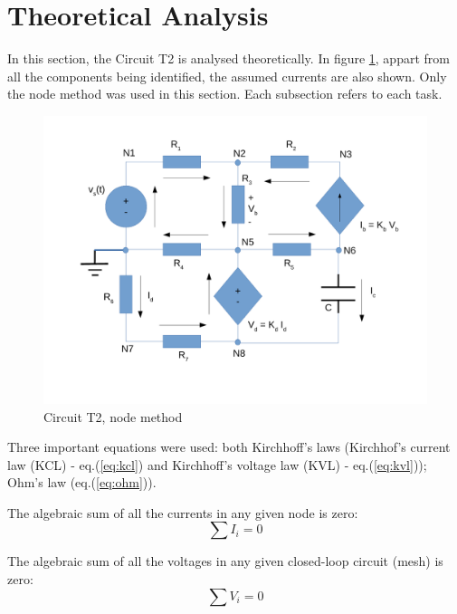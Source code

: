 
\section{Theoretical Analysis}
\label{sec:analysis}



In this section, the Circuit T2 is analysed theoretically. In figure \ref{fig:Dsnh_oct_t2},
appart from all the components being identified, the assumed currents are also shown.
Only the node method was used in this section. Each subsection refers to each task.

\begin{figure}[ht]
	\centering
	\includegraphics[width=0.75\linewidth]{dsnh_oct_t2.pdf}
	\caption{Circuit T2, node method}
\label{fig:Dsnh_oct_t2}
\end{figure}

Three important equations were used: both Kirchhoff's laws (Kirchhof's current law (KCL)
- eq.(\ref{eq:kcl}) and Kirchhoff's voltage law (KVL) - eq.(\ref{eq:kvl})); Ohm's law
(eq.(\ref{eq:ohm})).

The algebraic sum of all the currents in any given node is zero:
\begin{equation}
	\sum I_i = 0
	\label{eq:kcl}
\end{equation}

The algebraic sum of all the voltages in any given closed-loop circuit (mesh) is zero:
\begin{equation}
	\sum V_i = 0
	\label{eq:kvl}
\end{equation}

